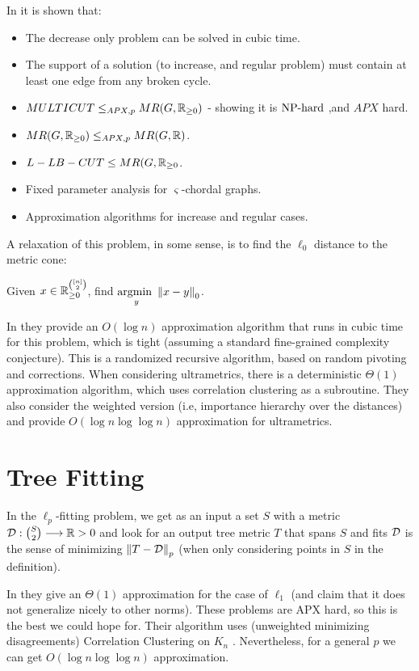 \documentclass[a4paper, 10pt]{book}
\begin{document}
	In \cite{fan2019generalized} it is shown that:
	\begin{itemize}
		\item The decrease only problem can be solved in cubic time.
		\item The support of a solution (to increase, and regular problem) must contain at least one edge from any broken cycle.
		\item $MULTICUT\le_{APX,p} MR(G,\mathbb{R}_{\ge 0})$ - showing it is $\operatorname{NP-hard}$ ,and $APX$ hard.
		\item $MR(G,\mathbb{R}_{\ge 0})\le_{APX,p} MR(G,\mathbb{R})$.
		\item $L-LB-CUT \le MR(G,\mathbb{R}_{\ge 0}$.
		\item Fixed parameter analysis for $\varsigma$-chordal graphs.
		\item Approximation algorithms for increase and regular cases.
	\end{itemize}
	A relaxation of this problem, in some sense, is to find the $\ell_0$ distance to the metric cone:
	\begin{defn}
		Given $x\in \mathbb{R}_{\ge 0}^{[n]\choose 2}$, find $\underset{ y }{\textrm{argmin }}\left\|x-y\right\|_0$.
	\end{defn}
	In \cite{cohen2022fitting} they provide an $O(\log n)$ approximation algorithm that runs in cubic time for this problem, which is tight (assuming a standard fine-grained complexity conjecture). This is a randomized recursive algorithm, based on random pivoting and corrections. When considering ultrametrics, there is a deterministic $\Theta(1)$ approximation algorithm, which uses correlation clustering \cite{bansal2004correlation} as a subroutine. They also consider the weighted version (i.e, importance hierarchy over the distances) and provide $O(\log n \log\log n)$ approximation for ultrametrics.
	\section{Tree Fitting}
	\begin{defn}
In the $\ell_p$-fitting problem, we get as an input a set $S$ with a metric $\mathcal{D}:{S\choose 2}	\longrightarrow \mathbb{R}>0$ and look for an output tree metric $T$ that spans $S$ and fits $\mathcal{D}$ is the sense of minimizing $\left\|T-\mathcal{D}\right\|_p$ (when only considering points in $S$ in the definition).
	\end{defn}
	In \cite{cohen2022fitting} they give an $\Theta(1)$ approximation for the case of $\ell_1$ (and claim that it does not generalize nicely to other norms). These problems are APX hard, so this is the best we could hope for. Their algorithm uses (unweighted minimizing disagreements) Correlation Clustering on $K_n$ \cite{bansal2004correlation}. 
	Nevertheless, for a general $p$ we can get $O(\log n \log\log n)$ approximation.
\end{document}
